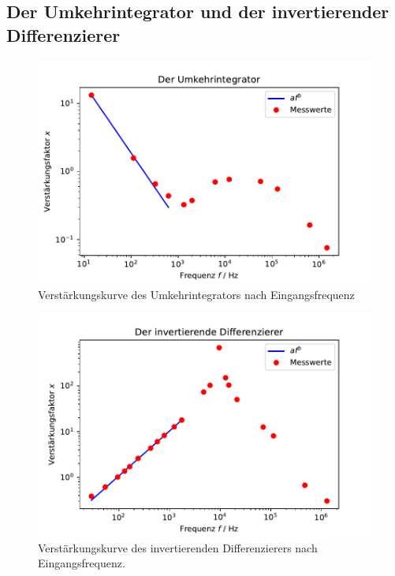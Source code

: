 \subsection{Der Umkehrintegrator und der invertierender Differenzierer}
\label{sec:umkehrintegrator}
\begin{figure}
    \centering
    \includegraphics{content/grafiken/umkehrintegrator.pdf}
    \caption{Verstärkungskurve des Umkehrintegrators nach Eingangsfrequenz}
    \label{fig:umkehrintegrator}
  \end{figure}


  \begin{figure}
    \centering
    \includegraphics{content/grafiken/invdifferenzierer.pdf}
    \caption{Verstärkungskurve des invertierenden Differenzierers nach Eingangsfrequenz.}
    \label{fig:invdifferenzierer}
  \end{figure}





